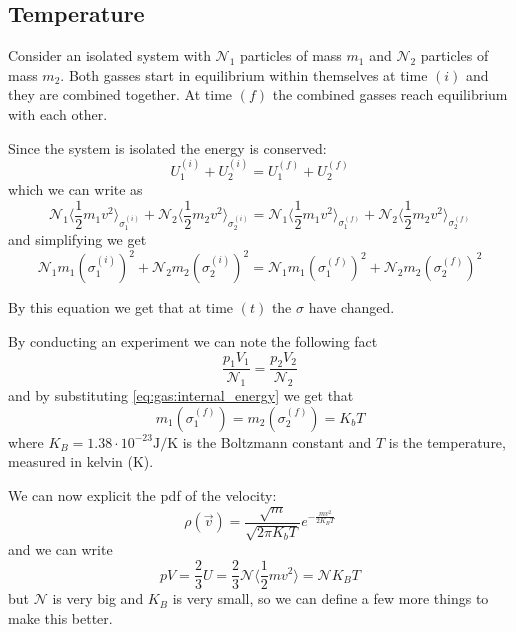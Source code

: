 \documentclass[14pt]{extarticle}
\newcommand{\anglebraces}[1]{
    \langle #1 \rangle
}
\begin{document}
\subsection{Temperature}

Consider an isolated system with $\mathscr{N}_1$ particles of mass $m_1$ and $\mathscr{N}_2$ particles of mass $m_2$.
Both gasses start in equilibrium within themselves at time $(i)$ and they are combined together.
At time $(f)$ the combined gasses reach equilibrium with each other.

Since the system is isolated the energy is conserved:
\begin{equation}
    U_1^{(i)} + U_2^{(i)} = U_1^{(f)} + U_2^{(f)}
\end{equation}
which we can write as
\begin{equation}
    \mathscr{N}_1 \anglebraces{\frac{1}{2} m_1 v^2}_{\sigma_1^{(i)}} + \mathscr{N}_2 \anglebraces{\frac{1}{2} m_2 v^2}_{\sigma_2^{(i)}} = \mathscr{N}_1 \anglebraces{\frac{1}{2} m_1 v^2}_{\sigma_1^{(f)}} + \mathscr{N}_2 \anglebraces{\frac{1}{2} m_2 v^2}_{\sigma_2^{(f)}}
\end{equation}
and simplifying we get
\begin{equation}
    \mathscr{N}_1 m_1 \left(\sigma_1^{(i)}\right)^2 + \mathscr{N}_2 m_2 \left(\sigma_2^{(i)}\right)^2 = \mathscr{N}_1 m_1 \left(\sigma_1^{(f)}\right)^2 + \mathscr{N}_2 m_2 \left(\sigma_2^{(f)}\right)^2
\end{equation}

By this equation we get that at time $(t)$ the $\sigma$ have changed.

By conducting an experiment we can note the following fact
\begin{equation}
    \frac{p_1 V_1}{\mathscr{N}_1} = \frac{p_2 V_2}{\mathscr{N}_2}
\end{equation}
and by substituting \autoref{eq:gas:internal_energy} we get that
\begin{equation}
    m_1 \left( \sigma_1^{(f)} \right) = m_2 \left(\sigma_2^{(f)}\right) = K_b T
\end{equation}
where $K_B = 1.38 \cdot 10^{-23} \si{\joule \per \kelvin}$ is the Boltzmann constant and $T$ is the temperature, measured in kelvin ($\si{\kelvin}$).

We can now explicit the pdf of the velocity:
\begin{equation}
    \rho(\vec v) = \frac{\sqrt{m}}{\sqrt{2 \pi K_b T}} e^{- \frac{m v^2}{2 K_B T}}
\end{equation}
and we can write
\begin{equation}
    \label{eq:gas:initial_perfect}
    p V = \frac{2}{3}U = \frac{2}{3}\mathscr{N} \anglebraces{\frac{1}{2}mv^2} = \mathscr{N}K_B T
\end{equation}
but $\mathscr{N}$ is very big and $K_B$ is very small, so we can define a few more things to make this better.
\end{document}
